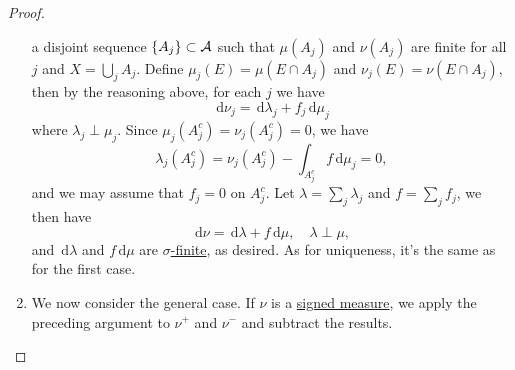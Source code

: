 \begin{proof}
\begin{enumerate}
		      a disjoint sequence \(\{A_j\}\subset \mathcal{\MakeUppercase{a}} \) such that \(\mu (A_{j} )\) and \(\nu (A_{j} )\) are finite for all \(j\) and \(X = \bigcup_{j} A_{j} \).
		      Define \(\mu _{j} (E) = \mu (E \cap A_{j} )\) and \(\nu _{j} (E)= \nu (E \cap A_{j} )\), then by the reasoning above, for each \(j\) we have
		      \[
			      \,\mathrm{d} \nu _{j} = \,\mathrm{d} \lambda _{j} + f_{j} \,\mathrm{d} \mu _{j}
		      \]
		      where \(\lambda _{j} \perp \mu _{j} \). Since \(\mu _{j} (A^{c} _{j} ) = \nu _{j} (A^{c} _{j} ) = 0\), we have
		      \[
			      \lambda _{j} (A^{c} _{j} ) = \nu _{j} (A^{c} _{j} )- \int _{A^{c} _{j} }f \,\mathrm{d} \mu _{j} = 0,
		      \]
		      and we may assume that \(f_{j} = 0\) on \(A^{c} _{j} \). Let \(\lambda = \sum_j \lambda _{j} \) and \(f = \sum_{j}f_{j}  \), we then have
		      \[
			      \,\mathrm{d} \nu = \,\mathrm{d} \lambda + f \,\mathrm{d} \mu , \quad \lambda \perp \mu ,
		      \]
		      and \(\,\mathrm{d} \lambda \) and \(f \,\mathrm{d} \mu \) are \hyperref[def:finite-signed-measure]{\(\sigma \)-finite}, as desired. As for uniqueness, it's the same
		      as for the first case.
		\item We now consider the general case. If \(\nu\) is a \hyperref[def:signed-measure]{signed measure}, we apply the preceding argument to \(\nu ^+\) and
		      \(\nu ^-\) and subtract the results.
	\end{enumerate}
\end{proof}